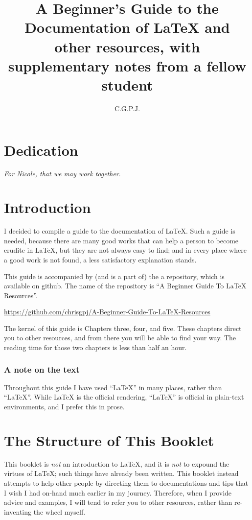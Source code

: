 \documentclass[11pt, oneside]{memoir}
\title{A Beginner's Guide to the Documentation of \LaTeX{} and other resources, with supplementary notes from a fellow student}
\author{C.\thinspace G.\thinspace P.\thinspace J.\thinspace}
\begin{document}
\maketitle
\thispagestyle{empty}

\RaggedRight

\chapter*{Dedication}
\emph{For Nicole, that we may work together}.

\newpage
\tableofcontents

\chapter{Introduction}
I decided to compile a guide to the documentation of \LaTeX{}. Such a guide is needed, because there are many good works that can help a person to become erudite in \LaTeX{}, but they are not always easy to find; and in every place where a good work is not found, a less satisfactory explanation stands.

This guide is accompanied by (and is a part of) the a repository, which is available on github. The name of the repository is ``A Beginner Guide To LaTeX Resources''.

\url{https://github.com/chrisgpj/A-Beginner-Guide-To-LaTeX-Resources}

The kernel of this guide is Chapters three, four, and five. These chapters direct you to other resources, and from there you will be able to find your way. The reading time for those two chapters is less than half an hour.

\subsection{A note on the text}
Throughout this guide I have used ``LaTeX'' in many places, rather than ``\LaTeX{}''. While \LaTeX{} is the official rendering, ``LaTeX'' is official in plain-text environments, and I prefer this in prose.

\chapter{The Structure of This Booklet}
This booklet is \emph{not} an introduction to LaTeX, and it is \emph{not} to expound the virtues of LaTeX; such things have already been written. This booklet instead attempts to help other people by directing them to documentations and tips that I wish I had on-hand much earlier in my journey. Therefore, when I provide advice and examples, I will tend to refer you to other resources, rather than re-inventing the wheel myself.
\end{document}
